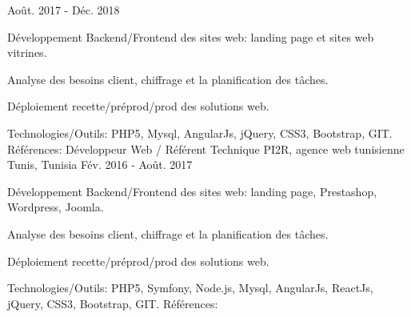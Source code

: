 \begin{cventries}
    {Août. 2017 - Déc. 2018}
    {
      \begin{cvitems}
        \item {Développement Backend/Frontend des sites web: landing page et sites web vitrines.}
        \item {Analyse des besoins client, chiffrage et la planification des tâches.}
        \item {Déploiement recette/préprod/prod des solutions web.}
      \end{cvitems}
    }
    {\textcolor{awesome}{Technologies/Outils: } {\color{graytext}}  {PHP5, Mysql, AngularJs, jQuery, CSS3, Bootstrap, GIT.}}
    {Références:} 
    {\href{http://www.cooperons.com/}{} \break
    \href{http://www.tisc.tn/ }{} \break
    }
  \techentries
    {Développeur Web / Référent Technique}
    {PI2R, agence web tunisienne}
    {Tunis, Tunisia}
    {Fév. 2016 - Août. 2017}
    {
      \begin{cvitems}
        \item {Développement Backend/Frontend des sites web: landing page, Prestashop, Wordpress, Joomla.}
        \item {Analyse des besoins client, chiffrage et la planification des tâches.}
        \item {Déploiement recette/préprod/prod des solutions web.}
      \end{cvitems}
    }
    {\textcolor{awesome}{Technologies/Outils: } {\color{graytext}}  {PHP5, Symfony, Node.js, Mysql, AngularJs, ReactJs, jQuery, CSS3, Bootstrap, GIT.}}
    {Références:} 
    {
      \href{http://www.tuttosport.tn/}{} \break
      \href{http://www.milddream.com/fr/ }{} \break
      \href{https://www.tvsoftconsult.com/ }{} \break
      \href{http://www.ordre-medecins.org.tn/fr/ }{} \break
      \href{http://orthodontiste-narimen-djerbi.com/ }{} \break
}
\end{cventries}
